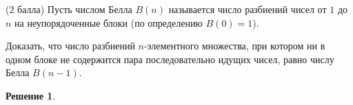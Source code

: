 \documentclass[12pt,fleqn,a4paper]{article}
\newtheorem*{solution}{Решение}
\newenvironment{task}[2] {
	\noindent\fbox{\bf {#1} {#2}.}
}{
}
\begin{document}
	\begin{task}{DM}{39}
		(2 балла) Пусть числом Белла $B(n)$ называется число разбиений чисел от $1$ до $n$ на неупорядоченные блоки (по определению $B(0) = 1$).
		
		Доказать, что число разбиений $n$-элементного множества, при котором ни в одном блоке не содержится пара последовательно идущих чисел,
		равно числу Белла $B(n - 1)$.
	\end{task}
	\begin{solution}
	\end{solution}
\end{document}
